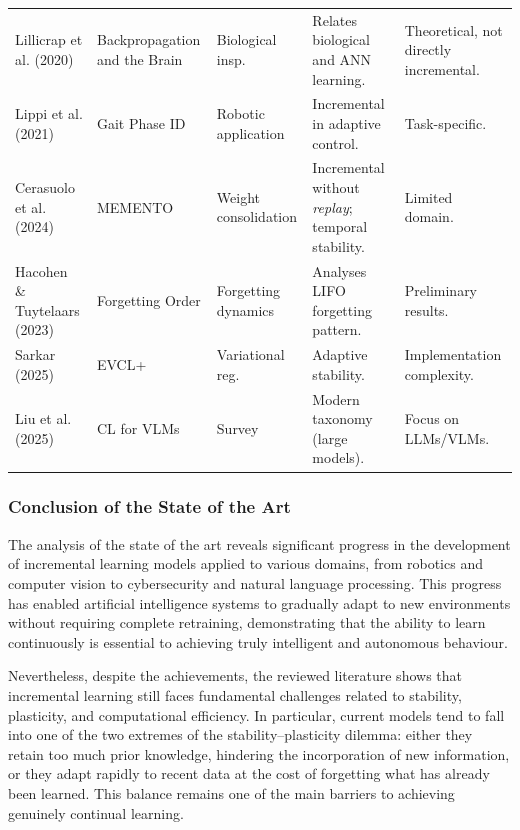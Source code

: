\begin{table}[H]
\begin{tabularx}{\textwidth}{
  >{\raggedright\arraybackslash}p{3.5cm}
  >{\raggedright\arraybackslash}p{2.8cm}
  >{\raggedright\arraybackslash}p{2.8cm}
  >{\raggedright\arraybackslash}X
  >{\raggedright\arraybackslash}X}
Lillicrap et al. (2020) \cite{lillicrap2020} & Backpropagation and the Brain & Biological insp. & Relates biological and ANN learning. & Theoretical, not directly incremental. \\
Lippi et al. (2021) \cite{lippi2021} & Gait Phase ID & Robotic application & Incremental in adaptive control. & Task-specific. \\
Cerasuolo et al. (2024) \cite{CERASUOLO2024} & MEMENTO & Weight consolidation & Incremental without \textit{replay}; temporal stability. & Limited domain. \\
Hacohen \& Tuytelaars (2023) \cite{hacohenforgetting} & Forgetting Order & Forgetting dynamics & Analyses LIFO forgetting pattern. & Preliminary results. \\
Sarkar (2025) \cite{sarkar2025adaptive} & EVCL+ & Variational reg. & Adaptive stability. & Implementation complexity. \\
Liu et al. (2025) \cite{liu2025continual} & CL for VLMs & Survey & Modern taxonomy (large models). & Focus on LLMs/VLMs. \\
\bottomrule
\end{tabularx}
\end{table}

\subsubsection{Conclusion of the State of the Art}

The analysis of the state of the art reveals significant progress in the development of incremental learning models applied to various domains, from robotics and computer vision to cybersecurity and natural language processing. 
This progress has enabled artificial intelligence systems to gradually adapt to new environments without requiring complete retraining, demonstrating that the ability to learn continuously is essential to achieving truly intelligent and autonomous behaviour.

Nevertheless, despite the achievements, the reviewed literature shows that incremental learning still faces fundamental challenges related to stability, plasticity, and computational efficiency. 
In particular, current models tend to fall into one of the two extremes of the stability–plasticity dilemma: either they retain too much prior knowledge, hindering the incorporation of new information, or they adapt rapidly to recent data at the cost of forgetting what has already been learned. 
This balance remains one of the main barriers to achieving genuinely continual learning.

